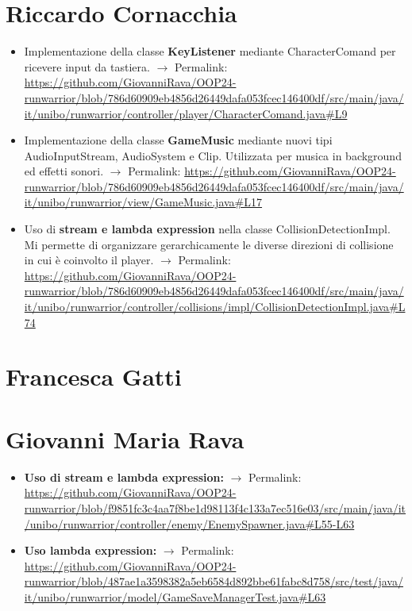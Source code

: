 \documentclass[a4paper,12pt]{report}
\begin{document}
\section{Riccardo Cornacchia}
\begin{itemize}
    \item Implementazione della classe \textbf{KeyListener} mediante CharacterComand per ricevere input da tastiera. $\rightarrow$ Permalink:
    \url{https://github.com/GiovanniRava/OOP24-runwarrior/blob/786d60909eb4856d26449dafa053fcec146400df/src/main/java/it/unibo/runwarrior/controller/player/CharacterComand.java#L9}
    \item Implementazione della classe \textbf{GameMusic} mediante nuovi tipi AudioInputStream, AudioSystem e Clip. 
    Utilizzata per musica in background ed effetti sonori. $\rightarrow$ Permalink:
    \url{https://github.com/GiovanniRava/OOP24-runwarrior/blob/786d60909eb4856d26449dafa053fcec146400df/src/main/java/it/unibo/runwarrior/view/GameMusic.java#L17}
    \item Uso di \textbf{stream e lambda expression} nella classe CollisionDetectionImpl. Mi permette di organizzare gerarchicamente 
    le diverse direzioni di collisione in cui è coinvolto il player. $\rightarrow$ Permalink:
    \url{https://github.com/GiovanniRava/OOP24-runwarrior/blob/786d60909eb4856d26449dafa053fcec146400df/src/main/java/it/unibo/runwarrior/controller/collisions/impl/CollisionDetectionImpl.java#L74}
\end{itemize}
\section{Francesca Gatti}
\section{Giovanni Maria Rava}
\begin{itemize}
    \item \textbf{Uso di stream e lambda expression:} $\rightarrow$ Permalink:
    \url{https://github.com/GiovanniRava/OOP24-runwarrior/blob/f9851fc3c4aa7f8be1d98113f4c133a7ec516e03/src/main/java/it/unibo/runwarrior/controller/enemy/EnemySpawner.java#L55-L63}
    \item \textbf{Uso lambda expression:} $\rightarrow$ Permalink:
    \url{https://github.com/GiovanniRava/OOP24-runwarrior/blob/487ae1a3598382a5eb6584d892bbe61fabc8d758/src/test/java/it/unibo/runwarrior/model/GameSaveManagerTest.java#L63}
\end{itemize}
\end{document}
